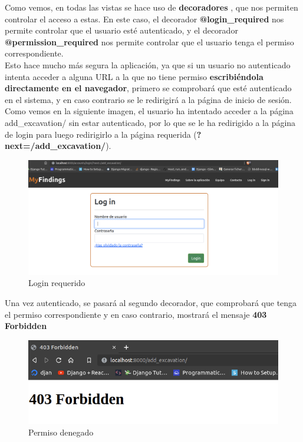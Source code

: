 Como vemos, en todas las vistas se hace uso de \textbf{decoradores} \cite{decorators},
que nos permiten controlar el acceso a estas. En este caso, el decorador
\textbf{@login\_required} nos permite controlar que el usuario esté autenticado,
y el decorador \textbf{@permission\_required} nos permite controlar que el usuario
tenga el permiso correspondiente.\\

Esto hace mucho más segura la aplicación, ya que si un usuario no autenticado intenta
acceder a alguna URL a la que no tiene permiso \textbf{escribiéndola directamente en
el navegador}, primero se comprobará que esté autenticado en el sistema, y en caso
contrario se le redirigirá a la página de inicio de sesión. Como vemos en la siguiente
imagen, el usuario ha intentado acceder a la página add\_excavation/ sin estar autenticado,
por lo que se le ha redirigido a la página de login para luego redirigirlo a la página
requerida (\textbf{?next=/add\_excavation/}).

    \begin{figure}[H]
        \centering
        \includegraphics[scale=0.26]{imagenes/login-required.png}
        \caption{Login requerido}
        \label{fig:login-required}
    \end{figure}


\newpage Una vez autenticado, se pasará al segundo decorador, que comprobará que tenga el permiso
correspondiente y en caso contrario, mostrará el mensaje \textbf{403 Forbidden}

    \begin{figure}[H]
        \centering
        \includegraphics[scale=0.50]{imagenes/403-forbidden.png}
        \caption{Permiso denegado}
        \label{fig:403-forbidden}
    \end{figure}

